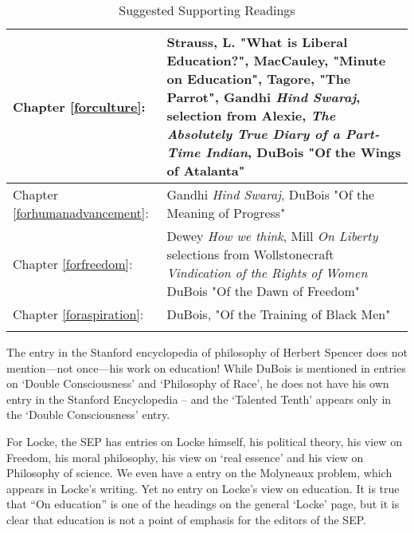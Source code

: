 \begin{longtable}[!t]{ | p{4cm} | P{6.5cm} |   }
Chapter \ref{forculture}: &Strauss, L. "What is Liberal Education?", \newline MacCauley, "Minute on Education", \newline Tagore, "The Parrot", \newline Gandhi \emph{Hind Swaraj}, \newline selection from Alexie, \emph{The Absolutely True Diary of a Part-Time Indian}, \newline DuBois "Of the Wings of Atalanta"\\ \hline
Chapter \ref{forhumanadvancement}: &Gandhi \emph{Hind Swaraj}, \newline DuBois "Of the Meaning of Progress"\\ \hline
Chapter \ref{forfreedom}: &Dewey \emph{How we think}, \newline Mill \emph{On Liberty} \newline selections from Wollstonecraft \emph{Vindication of the Rights of Women} \newline DuBois "Of the Dawn of Freedom" \\ \hline
Chapter \ref{foraspiration}: &DuBois, "Of the Training of Black Men"\\ \hline
            \caption{Suggested Supporting Readings}
\label{table: readings}
\end{longtable}

The entry in the Stanford encyclopedia of philosophy of Herbert Spencer does not mention---not once---his work on education! While DuBois is mentioned in entries on `Double Consciousness' and `Philosophy of Race', he does not have his own entry in the Stanford Encyclopedia -- and the `Talented Tenth' appears only in the `Double Consciousness' entry. 

For Locke, the SEP has entries on Locke himself, his political theory, his view on Freedom, his moral philosophy, his view on `real essence' and his view on Philosophy of science. We even have a entry on the Molyneaux problem, which appears in Locke's writing. Yet no entry on Locke's view on education. It is true that ``On education'' is one of the headings on the general `Locke' page, but it is clear that education is not a point of emphasis for the editors of the SEP.

 \newpage
\tableofcontents
\listoftables
\listoffigures
\listoftheorems[ignoreall,show={mypurpose,mythesis,myentities,myobjects}]

\setcounter{secnumdepth}{3}

